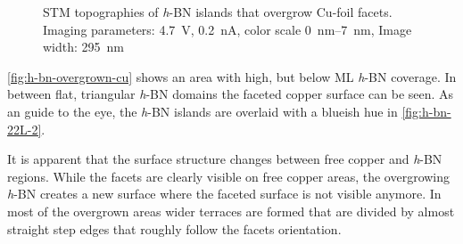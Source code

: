 	\begin{figure}[h!]
		\centering
		 \quad %
		\caption{STM topographies of \textit{h}-BN islands that overgrow Cu-foil facets. Imaging parameters: 		
			\SI{4.7}{\volt}, \SI{0.2}{\nano\ampere}, color scale \SIrange{0}{7}{\nano\meter}, Image width: \SI{295}{\nano \meter}
		}%
		\label{fig:h-bn-overgrown-cu}
	\end{figure}
\autoref{fig:h-bn-overgrown-cu} shows an area with high, but below ML \textit{h}-BN coverage. In between flat, triangular \textit{h}-BN domains the faceted copper surface can be seen. As an guide to the eye, the \textit{h}-BN islands are overlaid with a blueish hue in \autoref{fig:h-bn-22L-2}.

It is apparent that the surface structure changes between free copper and \textit{h}-BN regions. While the facets are clearly visible on free copper areas, the overgrowing \textit{h}-BN creates a new surface where the faceted surface is not visible anymore. In most of the overgrown areas wider terraces are formed that are divided by almost straight step edges that roughly follow the facets orientation.

